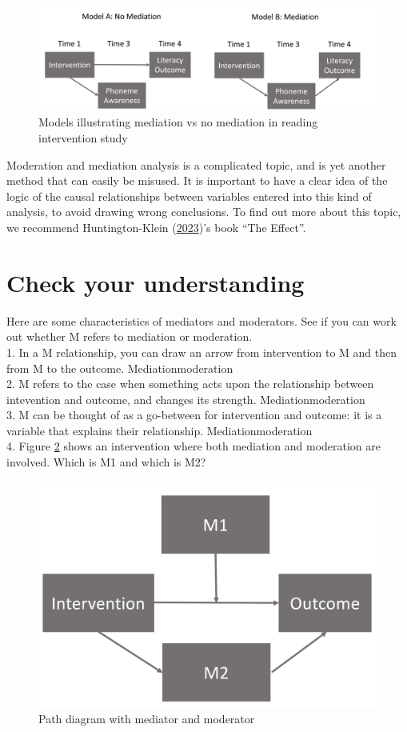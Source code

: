 \documentclass{krantz}
\begin{document}
\begin{figure}
\includegraphics[width=0.85\linewidth]{images_bw/mediation_diagram} \caption{Models illustrating mediation vs no mediation in reading intervention study}\label{fig:medfig}
\end{figure}

Moderation and mediation analysis is a complicated topic, and is yet another method that can easily be misused. It is important to have a clear idea of the logic of the causal relationships between variables entered into this kind of analysis, to avoid drawing wrong conclusions. To find out more about this topic, we recommend Huntington-Klein (\protect\hyperlink{ref-huntington-klein}{2023})'s book ``The Effect''.

\hypertarget{check-your-understanding-15}{%
\section{Check your understanding}\label{check-your-understanding-15}}

Here are some characteristics of mediators and moderators. See if you can work out whether M refers to mediation or moderation.\\
1. In a M relationship, you can draw an arrow from intervention to M and then from M to the outcome. Mediation\textbar moderation\\
2. M refers to the case when something acts upon the relationship between intevention and outcome, and changes its strength. Mediation\textbar moderation\\
3. M can be thought of as a go-between for intervention and outcome: it is a variable that explains their relationship. Mediation\textbar moderation\\
4. Figure \ref{fig:medmodfig} shows an intervention where both mediation and moderation are involved. Which is M1 and which is M2?

\begin{figure}
\includegraphics[width=0.5\linewidth]{images_bw/medmod} \caption{Path diagram with mediator and moderator}\label{fig:medmodfig}
\end{figure}
\end{document}
